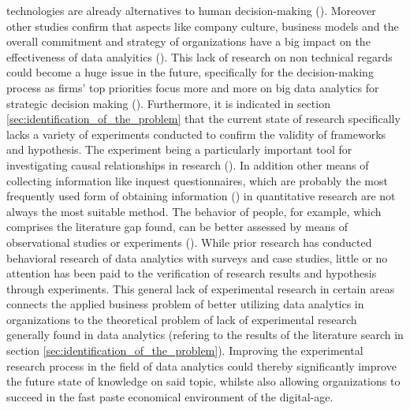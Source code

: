 technologies are already alternatives to human decision-making (\cite{Krakowski.2023}). Moreover other studies confirm that aspects like company culture, business models and the overall commitment and strategy of organizations have a big impact on the effectiveness of data analyitics (\cite{Holsapple.2014}). This lack of research on non technical regards could become a huge issue in the future, specifically for the decision-making process as firms' top priorities focus more and more on big data analytics for strategic decision making (\cite{Ghasemaghaei.2019}). Furthermore, it is indicated in section \ref{sec:identification_of_the_problem} that the current state of research specifically lacks a variety of experiments conducted to confirm the validity of frameworks and hypothesis. The experiment being a particularly important tool for investigating causal relationships in research (\cite{Gniewosz.2011}). In addition other means of collecting information like inquest questionnaires, which are probably the most frequently used form of obtaining information (\cite{Mummendey.2014}) in quantitative research are not always the most suitable method. The behavior of people, for example, which comprises the literature gap found, can be better assessed by means of observational studies or experiments (\cite{Gniewosz.2011}). While prior research has conducted behavioral research of data analytics with surveys and case studies, little or no attention has been paid to the verification of research results and hypothesis through experiments. This general lack of experimental research in certain areas connects the applied business problem of better utilizing data analytics in organizations to the theoretical problem of lack of experimental research generally found in data analytics (refering to the results of the literature search in section \ref{sec:identification_of_the_problem}). Improving the experimental research process in the field of data analytics could thereby significantly improve the future state of knowledge on said topic, whilste also allowing organizations to succeed in the fast paste economical environment of the digital-age.



